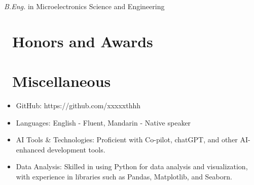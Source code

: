 \documentclass{resume}
\begin{document}
\textit{B.Eng.} in Microelectronics Science and Engineering

\section{\faHeartO\ Honors and Awards}

\section{\faInfo\ Miscellaneous}
\begin{itemize}[parsep=0.5ex]
  \item GitHub: https://github.com/xxxxxthhh
  \item Languages: English - Fluent, Mandarin - Native speaker
  \item AI Tools \& Technologies: Proficient with Co-pilot, chatGPT, and other AI-enhanced development tools.
  \item Data Analysis: Skilled in using Python for data analysis and visualization, with experience in libraries such as Pandas, Matplotlib, and Seaborn.
\end{itemize}

%
%
\end{document}
